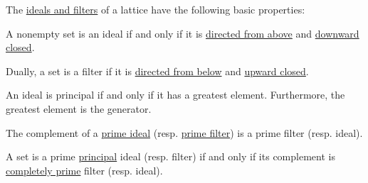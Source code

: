 \begin{proposition}\label{thm:def:lattice_ideal}
  The \hyperref[def:lattice_ideal]{ideals and filters} of a lattice have the following basic properties:
  \begin{thmenum}
     A nonempty set is an ideal if and only if it is \hyperref[def:directed_set]{directed from above} and \hyperref[def:closed_ordered_subset]{downward closed}.

    Dually, a set is a filter if it is \hyperref[def:directed_set]{directed from below} and \hyperref[def:closed_ordered_subset]{upward closed}.

     An ideal is principal if and only if it has a greatest element. Furthermore, the greatest element is the generator.

     The complement of a \hyperref[def:lattice_ideal/prime]{prime ideal} (resp. \hyperref[def:lattice_ideal/prime]{prime filter}) is a prime filter (resp. ideal).

     A set is a prime \hyperref[def:lattice_ideal/principal]{principal} ideal (resp. filter) if and only if its complement is \hyperref[def:lattice_ideal/completely_prime]{completely prime} filter (resp. ideal).
  \end{thmenum}
\end{proposition}
